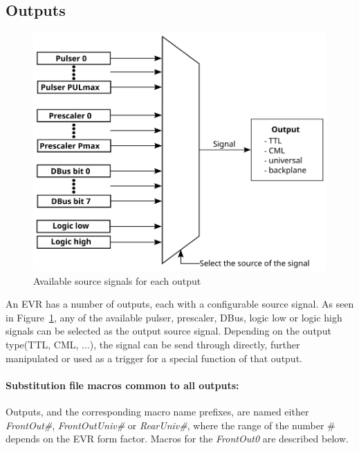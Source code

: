 \documentclass[12pt,a4paper]{article}
\begin{document}
\subsection{Outputs}\label{sec:Outputs}
\begin{figure}[H]
	\centering
	\includegraphics[]{./img/output}
	\caption{Available source signals for each output}
	\label{fig:output}
\end{figure}

An EVR has a number of outputs, each with a configurable source signal. As seen in Figure~\ref{fig:output}, any of the available pulser, prescaler, DBus, logic low or logic high signals can be selected as the output source signal. Depending on the output type(TTL, CML, ...), the signal can be send through directly, further manipulated or used as a trigger for a special function of that output.

\paragraph{Substitution file macros common to all outputs:} Outputs, and the corresponding macro name prefixes, are named either \emph{FrontOut\#},\emph{ FrontOutUniv\#} or \emph{RearUniv\#}, where the range of the number \# depends on the EVR form factor. Macros for the \emph{FrontOut0} are described below. 
\end{document}
